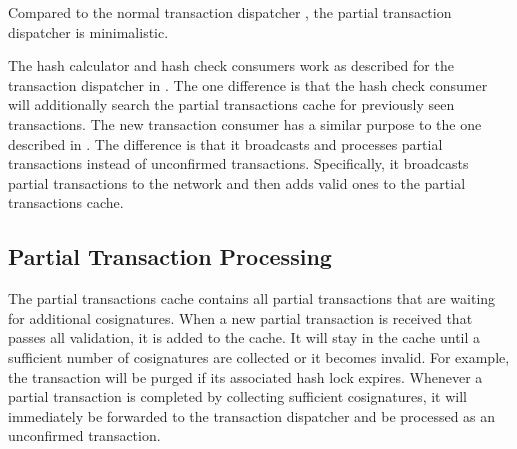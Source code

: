 Compared to the normal transaction dispatcher , the partial transaction dispatcher is minimalistic.

\begin{figure}[H]
\end{figure}

The hash calculator and hash check consumers work as described for the transaction dispatcher in .
The one difference is that the hash check consumer will additionally search the partial transactions cache for previously seen transactions.
The new transaction consumer has a similar purpose to the one described in .
The difference is that it broadcasts and processes partial transactions instead of unconfirmed transactions.
Specifically, it broadcasts partial transactions to the network and then adds valid ones to the partial transactions cache.

\subsection{Partial Transaction Processing}
\label{sec:partials:processing}

The partial transactions cache contains all partial transactions that are waiting for additional cosignatures.
When a new partial transaction is received that passes all validation, it is added to the cache.
It will stay in the cache until a sufficient number of cosignatures are collected or it becomes invalid.
For example, the transaction will be purged if its associated hash lock expires.
Whenever a partial transaction is completed by collecting sufficient cosignatures, it will immediately be forwarded to the transaction dispatcher and be processed as an unconfirmed transaction.

